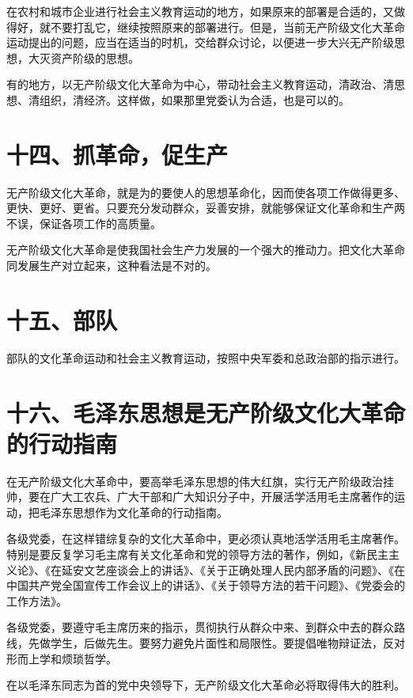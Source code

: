 在农村和城市企业进行社会主义教育运动的地方，如果原来的部署是合适的，又做得好，就不要打乱它，继续按照原来的部署进行。但是，当前无产阶级文化大革命运动提出的问题，应当在适当的时机，交给群众讨论，以便进一步大兴无产阶级思想，大灭资产阶级的思想。

有的地方，以无产阶级文化大革命为中心，带动社会主义教育运动，清政治、清思想、清组织，清经济。这样做，如果那里党委认为合适，也是可以的。

\section{十四、抓革命，促生产}

无产阶级文化大革命，就是为的要使人的思想革命化，因而使各项工作做得更多、更快、更好、更省。只要充分发动群众，妥善安排，就能够保证文化革命和生产两不误，保证各项工作的高质量。

无产阶级文化大革命是使我国社会生产力发展的一个强大的推动力。把文化大革命同发展生产对立起来，这种看法是不对的。

\section{十五、部队}

部队的文化革命运动和社会主义教育运动，按照中央军委和总政治部的指示进行。

\section{十六、毛泽东思想是无产阶级文化大革命的行动指南}

在无产阶级文化大革命中，要高举毛泽东思想的伟大红旗，实行无产阶级政治挂帅，要在广大工农兵、广大干部和广大知识分子中，开展活学活用毛主席著作的运动，把毛泽东思想作为文化革命的行动指南。

各级党委，在这样错综复杂的文化大革命中，更必须认真地活学活用毛主席著作。特别是要反复学习毛主席有关文化革命和党的领导方法的著作，例如，《新民主主义论》、《在延安文艺座谈会上的讲话》、《关于正确处理人民内部矛盾的问题》、《在中国共产党全国宣传工作会议上的讲话》、《关于领导方法的若干问题》、《党委会的工作方法》。

各级党委，要遵守毛主席历来的指示，贯彻执行从群众中来、到群众中去的群众路线，先做学生，后做先生。要努力避免片面性和局限性。要提倡唯物辩证法，反对形而上学和烦琐哲学。

在以毛泽东同志为首的党中央领导下，无产阶级文化大革命必将取得伟大的胜利。

